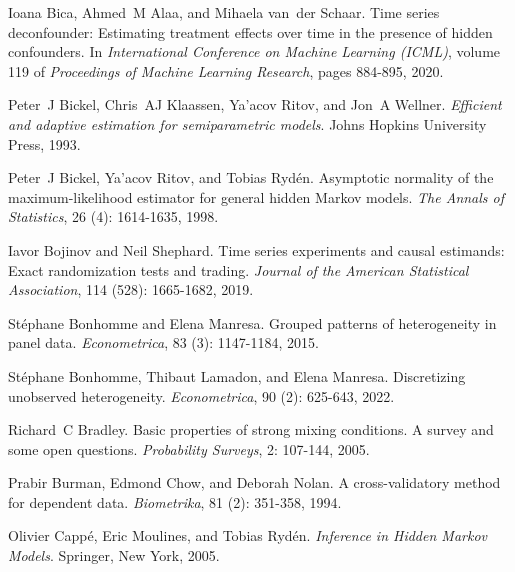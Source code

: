 Ioana Bica, Ahmed~M Alaa, and Mihaela van~der Schaar.
\newblock Time series deconfounder: Estimating treatment effects over time in the presence of hidden confounders.
\newblock In \emph{International Conference on Machine Learning (ICML)}, volume 119 of \emph{Proceedings of Machine Learning Research}, pages 884-895, 2020.

Peter~J Bickel, Chris~AJ Klaassen, Ya'acov Ritov, and Jon~A Wellner.
\newblock \emph{Efficient and adaptive estimation for semiparametric models}.
\newblock Johns Hopkins University Press, 1993.

Peter~J Bickel, Ya'acov Ritov, and Tobias Ryd{\'e}n.
\newblock Asymptotic normality of the maximum-likelihood estimator for general hidden {M}arkov models.
\newblock \emph{The Annals of Statistics}, 26 (4): 1614-1635, 1998.

Iavor Bojinov and Neil Shephard.
\newblock Time series experiments and causal estimands: Exact randomization tests and trading.
\newblock \emph{Journal of the American Statistical Association}, 114 (528): 1665-1682, 2019.

St{\'e}phane Bonhomme and Elena Manresa.
\newblock Grouped patterns of heterogeneity in panel data.
\newblock \emph{Econometrica}, 83 (3): 1147-1184, 2015.

St{\'e}phane Bonhomme, Thibaut Lamadon, and Elena Manresa.
\newblock Discretizing unobserved heterogeneity.
\newblock \emph{Econometrica}, 90 (2): 625-643, 2022.

Richard~C Bradley.
\newblock Basic properties of strong mixing conditions. {A} survey and some open questions.
\newblock \emph{Probability Surveys}, 2: 107-144, 2005.

Prabir Burman, Edmond Chow, and Deborah Nolan.
\newblock A cross-validatory method for dependent data.
\newblock \emph{Biometrika}, 81 (2): 351-358, 1994.

Olivier Capp{\'e}, Eric Moulines, and Tobias Ryd{\'e}n.
\newblock \emph{Inference in Hidden Markov Models}.
\newblock Springer, New York, 2005.

